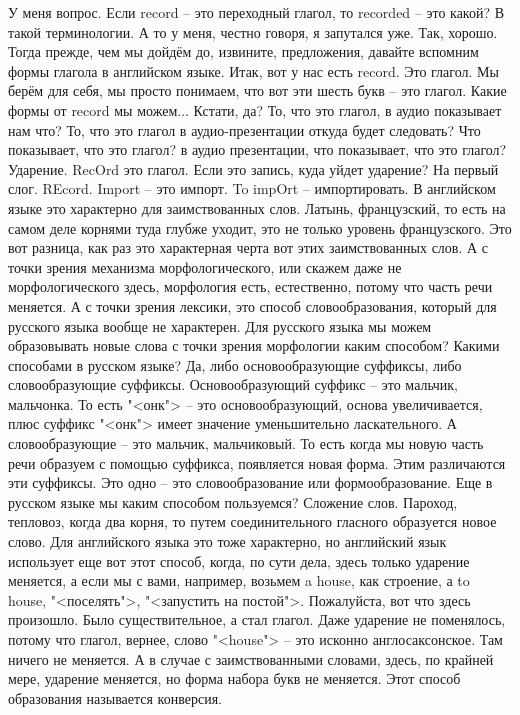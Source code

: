 \documentclass[main.tex]{subfiles}
\begin{document}
У меня вопрос.
Если record -- это переходный глагол, то recorded -- это какой? В такой терминологии.
А то у меня, честно говоря, я запутался уже.
Так, хорошо.
Тогда прежде, чем мы дойдём до, извините, предложения, давайте вспомним формы глагола в английском языке.
Итак, вот у нас есть record.
Это глагол.
Мы берём для себя, мы просто понимаем, что вот эти шесть букв -- это глагол.
Какие формы от record мы можем...
Кстати, да?
То, что это глагол, в аудио показывает нам что?
То, что это глагол в аудио-презентации откуда будет следовать?
Что показывает, что это глагол?
в аудио презентации, что показывает, что это глагол?
Ударение.
RecOrd это глагол.
Если это запись, куда уйдет ударение?
На первый слог.
REcord.
Import -- это импорт.
To impOrt -- импортировать.
В английском языке это характерно для заимствованных слов.
Латынь, французский, то есть на самом деле корнями туда глубже уходит, это не только уровень французского.
Это вот разница, как раз это характерная черта вот этих заимствованных слов.
А с точки зрения механизма морфологического, или скажем даже не морфологического здесь, морфология есть, естественно, потому что часть речи меняется.
А с точки зрения лексики, это способ словообразования, который для русского языка вообще не характерен.
Для русского языка мы можем образовывать новые слова с точки зрения морфологии каким способом?
Какими способами в русском языке?
Да, либо основообразующие суффиксы, либо словообразующие суффиксы.
Основообразующий суффикс -- это мальчик, мальчонка.
То есть "<онк"> -- это основообразующий, основа увеличивается, плюс суффикс "<онк"> имеет значение уменьшительно ласкательного.
А словообразующие -- это мальчик, мальчиковый.
То есть когда мы новую часть речи образуем с помощью суффикса, появляется новая форма.
Этим различаются эти суффиксы.
Это одно -- это словообразование или формообразование.
Еще в русском языке мы каким способом пользуемся?
Сложение слов.
Пароход, тепловоз, когда два корня, то путем соединительного гласного образуется новое слово.
Для английского языка это тоже характерно, но английский язык использует еще вот этот способ, когда, по сути дела, здесь только ударение меняется, а если мы с вами, например, возьмем a house, как строение, а to house, "<поселять">, "<запустить на постой">.
Пожалуйста, вот что здесь произошло.
Было существительное, а стал глагол.
Даже ударение не поменялось, потому что глагол, вернее, слово "<house"> -- это исконно англосаксонское.
Там ничего не меняется.
А в случае с заимствованными словами, здесь, по крайней мере, ударение меняется, но форма набора букв не меняется.
Этот способ образования называется конверсия.
\end{document}
